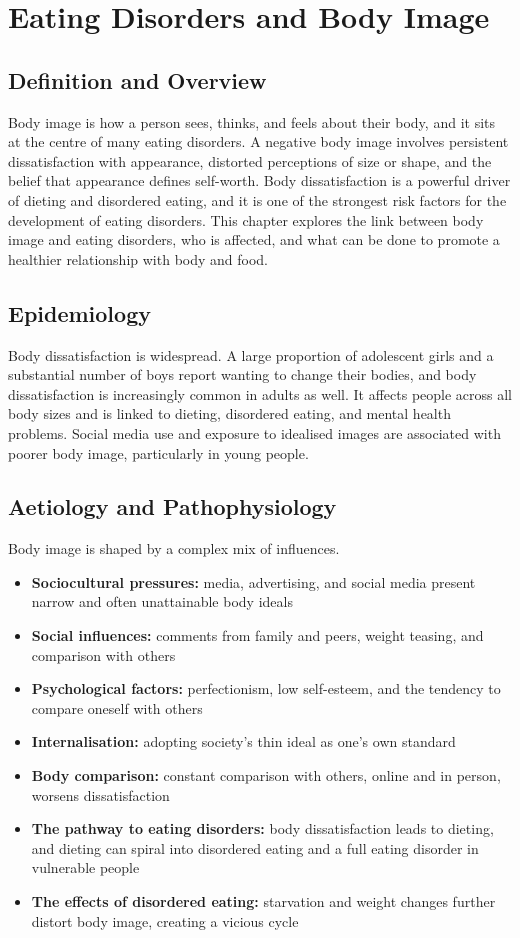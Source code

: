 \chapter{Eating Disorders and Body Image}

\section*{Definition and Overview}
Body image is how a person sees, thinks, and feels about their body, and it sits at the centre of many eating disorders. A negative body image involves persistent dissatisfaction with appearance, distorted perceptions of size or shape, and the belief that appearance defines self-worth. Body dissatisfaction is a powerful driver of dieting and disordered eating, and it is one of the strongest risk factors for the development of eating disorders. This chapter explores the link between body image and eating disorders, who is affected, and what can be done to promote a healthier relationship with body and food.

\section*{Epidemiology}
Body dissatisfaction is widespread. A large proportion of adolescent girls and a substantial number of boys report wanting to change their bodies, and body dissatisfaction is increasingly common in adults as well. It affects people across all body sizes and is linked to dieting, disordered eating, and mental health problems. Social media use and exposure to idealised images are associated with poorer body image, particularly in young people.

\section*{Aetiology and Pathophysiology}
Body image is shaped by a complex mix of influences.
\begin{itemize}
    \item \textbf{Sociocultural pressures:} media, advertising, and social media present narrow and often unattainable body ideals
    \item \textbf{Social influences:} comments from family and peers, weight teasing, and comparison with others
    \item \textbf{Psychological factors:} perfectionism, low self-esteem, and the tendency to compare oneself with others
    \item \textbf{Internalisation:} adopting society's thin ideal as one's own standard
    \item \textbf{Body comparison:} constant comparison with others, online and in person, worsens dissatisfaction
    \item \textbf{The pathway to eating disorders:} body dissatisfaction leads to dieting, and dieting can spiral into disordered eating and a full eating disorder in vulnerable people
    \item \textbf{The effects of disordered eating:} starvation and weight changes further distort body image, creating a vicious cycle
\end{itemize}

